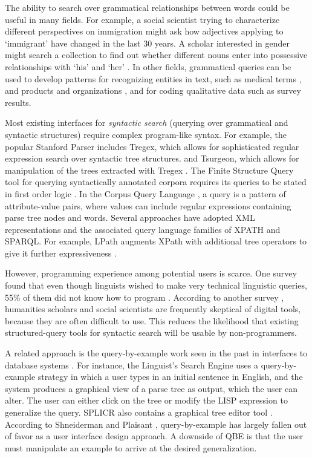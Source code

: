 The ability to search over grammatical relationships between words could be useful in many fields. For example, a social scientist trying to characterize different perspectives on immigration might ask how adjectives applying to `immigrant' have changed in the last 30 years. A scholar interested in gender might search a collection to find out whether different nouns enter into possessive relationships with `his' and `her' \cite{muralidharan2013supporting_anon}. In other fields, grammatical queries can be used to develop patterns for recognizing entities in text, such as medical terms \cite{hirschman2005overview,maclean2013identifying}, and  products and organizations \cite{culotta2005reducing}, and for coding qualitative data such as survey results.

Most existing interfaces for \emph{syntactic search} (querying over grammatical and syntactic structures) require complex program-like syntax. For example, the popular Stanford Parser includes Tregex, which allows for sophisticated regular expression search over syntactic tree structures.
and Tsurgeon, which allows for manipulation of the trees extracted with Tregex
\cite{levy2006tregex}.
The Finite Structure Query tool for querying syntactically annotated corpora requires its queries to be stated in first order logic \cite{kepser2003finite}. In the Corpus Query Language \cite{jakubicek2010fast}, a query is a pattern of attribute-value pairs, where values can include regular expressions containing parse tree nodes and words. Several approaches have adopted XML representations and the associated query language families of XPATH and SPARQL. For example, LPath augments XPath with additional tree operators to give it further expressiveness \cite{lai2010querying}.

However, programming experience among potential users is scarce. One survey found that even though linguists wished to make very technical  linguistic queries, 55\% of them did not know how to program \cite{soehn2008requirements}. According to another survey \cite{gibbs_building_2012}, humanities scholars and social scientists are frequently skeptical of digital tools, because they are often difficult to use. This reduces the likelihood that existing structured-query tools for syntactic search will be usable by non-programmers.

A related approach is the query-by-example work seen in the past in interfaces to database systems \cite{androutsopoulos1995natural}. For instance, the Linguist's Search Engine \cite{resnik2005web} uses a query-by-example strategy in which a user types in an initial sentence in English, and the system produces a graphical view of a parse tree as output, which the user can alter. The user can either click on the tree or modify the LISP expression to generalize the query. SPLICR also contains a graphical tree editor tool \cite{rehm2009sustainability}. According to Shneiderman and Plaisant \cite{shneiderman2010designing}, query-by-example has largely fallen out of favor as a user interface design approach. A downside of QBE is that the user must manipulate an example to arrive at the desired generalization.

